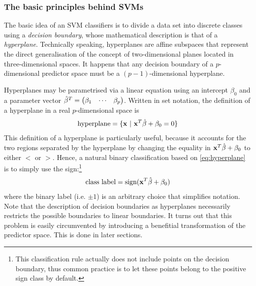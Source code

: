 \documentclass[nofootinbib,reprint,english]{revtex4-1}
\begin{document}
\subsubsection{The basic principles behind SVMs}
The basic idea of an SVM classifiers is to divide a data set into discrete classes using a \emph{decision boundary}, whose mathematical description is that of a \emph{hyperplane}. Technically speaking, hyperplanes are affine subspaces that represent the direct generalisation of the concept of two-dimensional planes located in three-dimensional spaces. It happens that any decision boundary of a \(p\)-dimensional predictor space must be a \((p-1)\)-dimensional hyperplane.

Hyperplanes may be parametrised via a linear equation using an intercept \(\beta_0\) and a parameter vector \(\hat{\beta}^T=\mqty(\beta_1&\cdots&\beta_p)\). Written in set notation, the definition of a hyperplane in a real \(p\)-dimensional space is
\begin{equation}\label{eq:hyperplane}
\text{hyperplane}=\{\vb{x}\ |\ \vb{x}^T\hat{\beta}+\beta_0=0\}
\end{equation}
This definition of a hyperplane is particularly useful, because it accounts for the two regions separated by the hyperplane by changing the equality in \(\vb{x}^T\hat{\beta}+\beta_0\) to either \(<\) or \(>\). Hence, a natural binary classification based on \eqref{eq:hyperplane} is to simply use the sign:\footnote{This classification rule actually does not include points on the decision boundary, thus common practice is to let these points belong to the positive sign class by default.}
\begin{equation}\label{eq:SVM_classification_rule}
\text{class label}=\text{sign}(\vb{x}^T\hat{\beta}+\beta_0)
\end{equation}
where the binary label (i.e. \(\pm1\)) is an arbitrary choice that simplifies notation. Note that the description of decision boundaries as hyperplanes necessarily restricts the possible boundaries to linear boundaries. It turns out that this problem is easily circumvented by introducing a benefitial transformation of the predictor space. This is done in later sections.
\end{document}
